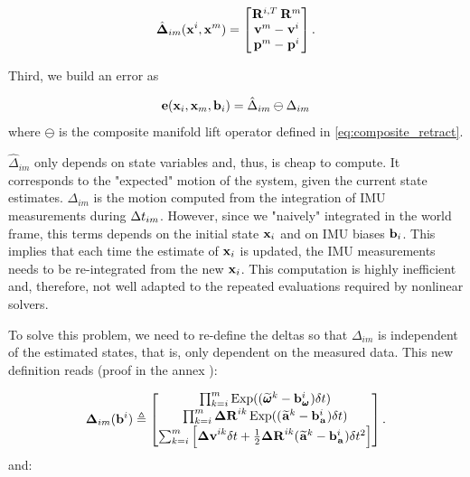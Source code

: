 \begin{align}
    \hat{{\bm \Delta}}_{im}({\bf x}^i, {\bf x}^m) = 
    \begin{bmatrix}
    \prescript{}{}{{\bf R}}_{}^{i,T} \prescript{}{}{{\bf R}}_{}^{m}  \\
    \prescript{}{}{{\bf v}}_{}^{m}  - \prescript{}{}{{\bf v}}_{}^{i}  \\
    \prescript{}{}{{\bf p}}_{}^{m} - \prescript{}{}{{\bf p}}_{}^{i}
    \end{bmatrix}.
\end{align}

Third, we build an error as

\begin{equation}
    {\bf e}({\bf x}_i, {\bf x}_m, {\bf b}_i) = \hat\Delta_{im} \ominus \Delta_{im}
    \label{eq:error_naive_preintegration}
\end{equation}
%
where $\ominus$ is the composite manifold lift operator defined in \ref{eq:composite_retract}.

$\hat\Delta_{im}$ only depends on state variables and, thus, is cheap to compute. It corresponds to the "expected" motion of the system, given the current state estimates. 
$\Delta_{im}$ is the motion computed from the integration of IMU measurements during $\Delta t_{im}$. However, since we "naively" integrated
in the world frame, this terms depends on the initial state ${\bf x}_i$ and on IMU biases ${\bf b}_i$. This implies that each time the estimate of ${\bf x}_i$ is updated, the IMU measurements needs to be re-integrated from the new ${\bf x}_i$. This computation is highly inefficient and, therefore, not well adapted to the repeated evaluations required by nonlinear solvers.

To solve this problem, we need to re-define the deltas so that $\Delta_{im}$ is independent of the estimated states, that is, only dependent on the measured data. This new definition reads \cite{lupton-09, forster2015imu} (proof in the annex ):

\begin{align}
    {\bm \Delta}_{im}({\bf b}^i) \triangleq 
    \begin{bmatrix}
    \prod_{k=i}^{m} \operatorname*{Exp}((\prescript{}{}{\widetilde{\pmb{\omega}}}_{}^k - {\bf b}_{\prescript{}{}{\pmb{\omega}}_{}}^i)\delta t)  \\
    \prod_{k=i}^{m} {\bm \Delta {\bf R}}^{ik} \operatorname*{Exp}((\prescript{}{}{\widetilde{{\bf a}}}_{}^k - {\bf b}_{\prescript{}{}{{\bf a}}_{}}^i)\delta t)  \\
    \sum_{k=i}^{m} \Big[{\bm \Delta {\bf v}}^{ik}\delta t +  \frac{1}{2} {\bm \Delta {\bf R}}^{ik} (\prescript{}{}{\widetilde{{\bf a}}}_{}^k - {\bf b}_{\prescript{}{}{{\bf a}}_{}}^i)\delta t^2 \Big]
    \end{bmatrix}.
    \label{eq:imu_delta}
\end{align}
%
and:


